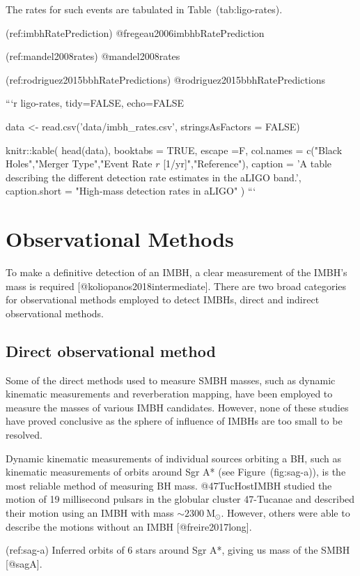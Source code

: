 {{{{The rates for such events are tabulated in Table~\@ref(tab:ligo-rates).


(ref:imbhRatePrediction) @fregeau2006imbhbRatePrediction

(ref:mandel2008rates) @mandel2008rates

(ref:rodriguez2015bbhRatePredictions) @rodriguez2015bbhRatePredictions

```{r ligo-rates, tidy=FALSE, echo=FALSE}

data <- read.csv('data/imbh_rates.csv',  stringsAsFactors = FALSE)

knitr::kable(
  head(data), booktabs = TRUE, escape =F,
  col.names = c("Black Holes","Merger Type","Event Rate $r$ [1/yr]","Reference"),
  caption = 'A table describing the different detection rate estimates in the aLIGO band.',
  caption.short = "High-mass detection rates in aLIGO" 
)
```


\section{Observational Methods}

To make a definitive detection of an IMBH, a clear measurement of the
IMBH's mass is required [@koliopanos2018intermediate].  There
are two broad categories for observational methods employed to detect
IMBHs, direct and indirect observational methods.

\subsection{Direct observational method}

Some of the direct methods used to measure SMBH masses, such as dynamic
kinematic measurements and reverberation mapping, have been employed
to measure the masses of various IMBH candidates. However, none of these
studies have proved conclusive as the sphere of influence of IMBHs are
too small to be resolved.

Dynamic kinematic measurements of individual sources orbiting a BH, such
as kinematic measurements of orbits around Sgr A* (see
Figure~\@ref(fig:sag-a)), is the most reliable method of measuring BH
mass. @47TucHostIMBH studied the motion of 19 millisecond pulsars in the
globular cluster 47-Tucanae and described their motion using an IMBH
with mass ${\sim2300\ \text{M}_{\odot}}$. However, others were able to
describe the motions without an IMBH [@freire2017long].

(ref:sag-a) Inferred orbits of 6 stars around Sgr A*, giving us mass of the SMBH [@sagA].

}}}}
